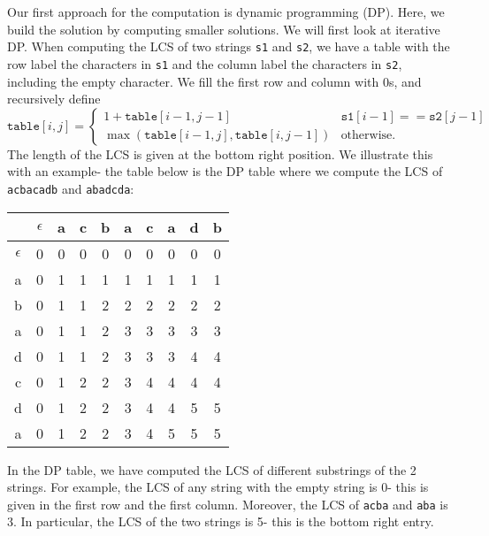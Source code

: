 \documentclass[a4paper, openany]{memoir}
\begin{document}
    Our first approach for the computation is dynamic programming (DP). Here, we build the solution by computing smaller solutions. We will first look at iterative DP. When computing the LCS of two strings \texttt{s1} and \texttt{s2}, we have a table with the  row label the characters in \texttt{s1} and the column label the characters in \texttt{s2}, including the empty character. We fill the first row and column with 0s, and recursively define
    \[\texttt{table}[i, j] = \begin{cases}
        1 + \texttt{table}[i-1, j-1] & \texttt{s1}[i-1] == \texttt{s2}[j-1] \\
        \max (\texttt{table}[i-1, j], \texttt{table}[i, j-1]) & \text{otherwise}.
    \end{cases}\]
    The length of the LCS is given at the bottom right position. We illustrate this with an example- the table below is the DP table where we compute the LCS of \texttt{acbacadb} and \texttt{abadcda}:
    \begin{table}[H]
        \centering
        \begin{tabular}{c|ccccccccc}
            & $\epsilon$ & a & c & b & a & c & a & d & b \\
            \hline 
            $\epsilon$ & 0 & 0 & 0 & 0 & 0 & 0 & 0 & 0 & 0 \\
            a & 0 & 1 & 1 & 1 & 1 & 1 & 1 & 1 & 1 \\
            b & 0 & 1 & 1 & 2 & 2 & 2 & 2 & 2 & 2 \\
            a & 0 & 1 & 1 & 2 & 3 & 3 & 3 & 3 & 3 \\
            d & 0 & 1 & 1 & 2 & 3 & 3 & 3 & 4 & 4 \\
            c & 0 & 1 & 2 & 2 & 3 & 4 & 4 & 4 & 4 \\
            d & 0 & 1 & 2 & 2 & 3 & 4 & 4 & 5 & 5 \\
            a & 0 & 1 & 2 & 2 & 3 & 4 & 5 & 5 & 5 
        \end{tabular}
    \end{table}
    In the DP table, we have computed the LCS of different substrings of the 2 strings. For example, the LCS of any string with the empty string is 0- this is given in the first row and the first column. Moreover, the LCS of \texttt{acba} and \texttt{aba} is 3. In particular, the LCS of the two strings is 5- this is the bottom right entry.
\end{document}
